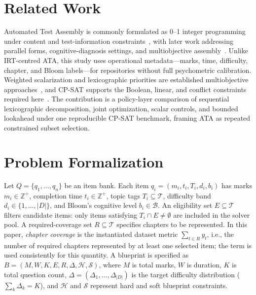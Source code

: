 \documentclass[runningheads]{llncs}
\begin{document}
\section{Related Work}
\label{sec:related}
Automated Test Assembly is commonly formulated as 0--1 integer programming under content and test-information constraints~\cite{theunissen1985,vanderLinden2005,vanderLinden1989,lord1980}, with later work addressing parallel forms, cognitive-diagnosis settings, and multiobjective assembly~\cite{ignjatovic2021,li2021,nguyen2021}. Unlike IRT-centred ATA, this study uses operational metadata---marks, time, difficulty, chapter, and Bloom labels---for repositories without full psychometric calibration. Weighted scalarization and lexicographic priorities are established multiobjective approaches~\cite{ehrgott2005,ignizio1976}, and CP-SAT supports the Boolean, linear, and conflict constraints required here~\cite{perron2023,nieuwenhuis2006}. The contribution is a policy-layer comparison of sequential lexicographic decomposition, joint optimization, scalar controls, and bounded lookahead under one reproducible CP-SAT benchmark, framing ATA as repeated constrained subset selection.
\section{Problem Formalization}
\label{sec:formalization}
Let $Q=\{q_1,\dots,q_n\}$ be an item bank. Each item $q_i=(m_i,t_i,T_i,d_i,b_i)$ has marks $m_i\in\mathbb{Z}^+$, completion time $t_i\in\mathbb{Z}^+$, topic tags $T_i\subseteq\mathcal{T}$, difficulty band $d_i\in\{1,\dots,|D|\}$, and Bloom's cognitive level $b_i\in\mathcal{B}$. An eligibility set $E\subseteq\mathcal{T}$ filters candidate items: only items satisfying $T_i\cap E\neq\emptyset$ are included in the solver pool. A required-coverage set $R\subseteq\mathcal{T}$ specifies chapters to be represented. In this paper, \emph{chapter coverage} is the instantiated dataset metric $\sum_{t\in R}y_t$, i.e., the number of required chapters represented by at least one selected item; the term is used consistently for this quantity.
A blueprint is specified as $B=(M,W,K,E,R,\Delta,\mathcal{H},\mathcal{S})$, where $M$ is total marks, $W$ is duration, $K$ is total question count, $\Delta=(\Delta_1,\dots,\Delta_{|D|})$ is the target difficulty distribution ($\sum_k\Delta_k=K$), and $\mathcal{H}$ and $\mathcal{S}$ represent hard and soft blueprint constraints.
\end{document}
